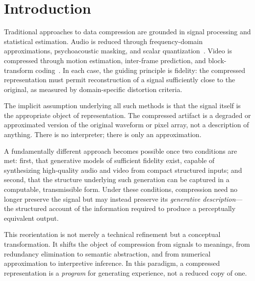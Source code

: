 \documentclass[12pt,a4paper]{article}
\theoremstyle{definition}
\theoremstyle{remark}
\begin{document}
\tableofcontents

\newpage

\section{Introduction}
\label{sec:intro}

Traditional approaches to data compression are grounded in signal processing and statistical estimation. Audio is reduced through frequency-domain approximations, psychoacoustic masking, and scalar quantization~\cite{coverthomas}. Video is compressed through motion estimation, inter-frame prediction, and block-transform coding~\cite{shannon1948}. In each case, the guiding principle is fidelity: the compressed representation must permit reconstruction of a signal sufficiently close to the original, as measured by domain-specific distortion criteria.

The implicit assumption underlying all such methods is that the signal itself is the appropriate object of representation. The compressed artifact is a degraded or approximated version of the original waveform or pixel array, not a description of anything. There is no interpreter; there is only an approximation.

A fundamentally different approach becomes possible once two conditions are met: first, that generative models of sufficient fidelity exist, capable of synthesizing high-quality audio and video from compact structured inputs; and second, that the structure underlying such generation can be captured in a computable, transmissible form. Under these conditions, compression need no longer preserve the signal but may instead preserve its \emph{generative description}---the structured account of the information required to produce a perceptually equivalent output.

This reorientation is not merely a technical refinement but a conceptual transformation. It shifts the object of compression from signals to meanings, from redundancy elimination to semantic abstraction, and from numerical approximation to interpretive inference. In this paradigm, a compressed representation is a \emph{program} for generating experience, not a reduced copy of one.
\end{document}
